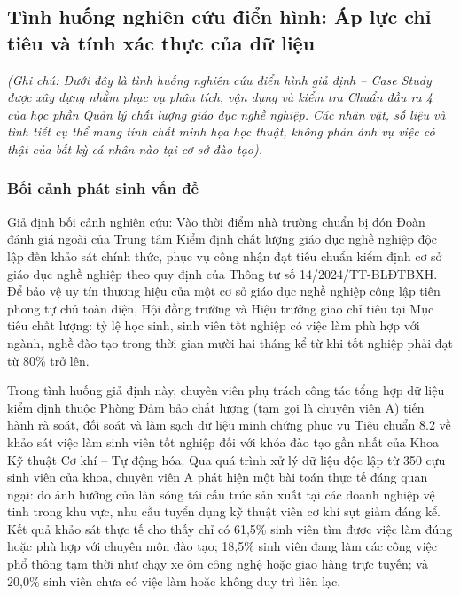 \subsection{Tình huống nghiên cứu điển hình: Áp lực chỉ tiêu và tính xác thực của dữ liệu}

\noindent\textit{(Ghi chú: Dưới đây là tình huống nghiên cứu điển hình giả định -- Case Study được xây dựng nhằm phục vụ phân tích, vận dụng và kiểm tra Chuẩn đầu ra 4 của học phần Quản lý chất lượng giáo dục nghề nghiệp. Các nhân vật, số liệu và tình tiết cụ thể mang tính chất minh họa học thuật, không phản ánh vụ việc có thật của bất kỳ cá nhân nào tại cơ sở đào tạo).}\par\vspace{0.2cm}

\subsubsection{Bối cảnh phát sinh vấn đề}

Giả định bối cảnh nghiên cứu: Vào thời điểm nhà trường chuẩn bị đón Đoàn đánh giá ngoài của Trung tâm Kiểm định chất lượng giáo dục nghề nghiệp độc lập đến khảo sát chính thức, phục vụ công nhận đạt tiêu chuẩn kiểm định cơ sở giáo dục nghề nghiệp theo quy định của Thông tư số 14/2024/TT-BLĐTBXH. Để bảo vệ uy tín thương hiệu của một cơ sở giáo dục nghề nghiệp công lập tiên phong tự chủ toàn diện, Hội đồng trường và Hiệu trưởng giao chỉ tiêu tại Mục tiêu chất lượng: tỷ lệ học sinh, sinh viên tốt nghiệp có việc làm phù hợp với ngành, nghề đào tạo trong thời gian mười hai tháng kể từ khi tốt nghiệp phải đạt từ 80\% trở lên.

Trong tình huống giả định này, chuyên viên phụ trách công tác tổng hợp dữ liệu kiểm định thuộc Phòng Đảm bảo chất lượng (tạm gọi là chuyên viên A) tiến hành rà soát, đối soát và làm sạch dữ liệu minh chứng phục vụ Tiêu chuẩn 8.2 về khảo sát việc làm sinh viên tốt nghiệp đối với khóa đào tạo gần nhất của Khoa Kỹ thuật Cơ khí -- Tự động hóa. Qua quá trình xử lý dữ liệu độc lập từ 350 cựu sinh viên của khoa, chuyên viên A phát hiện một bài toán thực tế đáng quan ngại: do ảnh hưởng của làn sóng tái cấu trúc sản xuất tại các doanh nghiệp vệ tinh trong khu vực, nhu cầu tuyển dụng kỹ thuật viên cơ khí sụt giảm đáng kể. Kết quả khảo sát thực tế cho thấy chỉ có 61,5\% sinh viên tìm được việc làm đúng hoặc phù hợp với chuyên môn đào tạo; 18,5\% sinh viên đang làm các công việc phổ thông tạm thời như chạy xe ôm công nghệ hoặc giao hàng trực tuyến; và 20,0\% sinh viên chưa có việc làm hoặc không duy trì liên lạc.

